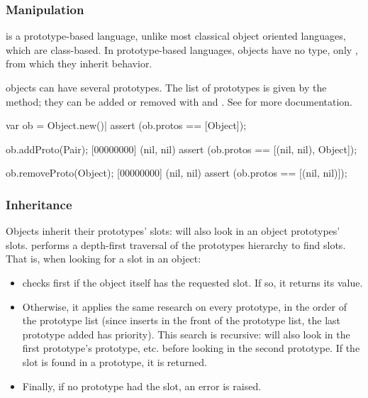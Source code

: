 \subsubsection{Manipulation}

\us is a prototype-based language, unlike most classical object oriented
languages, which are class-based. In prototype-based languages, objects have
no type, only , from which they inherit behavior.

\us objects can have several prototypes. The list of prototypes is given by
the  method; they can be added or removed with
 and .  See
 for more documentation.

\begin{urbiscript}
var ob = Object.new()|
assert (ob.protos == [Object]);

ob.addProto(Pair);
[00000000] (nil, nil)
assert (ob.protos == [(nil, nil), Object]);

ob.removeProto(Object);
[00000000] (nil, nil)
assert (ob.protos == [(nil, nil)]);
\end{urbiscript}

\subsubsection{Inheritance}

Objects inherit their prototypes' slots:  will also
look in an object prototypes' slots.  performs a
depth-first traversal of the prototypes hierarchy to find slots. That is,
when looking for a slot in an object:

\begin{itemize}
\item {} checks first if the object itself has the
  requested slot. If so, it returns its value.
\item Otherwise, it applies the same research on every prototype, in the
  order of the prototype list (since  inserts in
  the front of the prototype list, the last prototype added has
  priority). This search is recursive:  will also
  look in the first prototype's prototype, etc. before looking in the second
  prototype. If the slot is found in a prototype, it is returned.
\item Finally, if no prototype had the slot, an error is raised.
\end{itemize}

